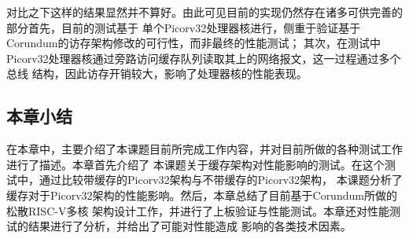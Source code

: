 对比之下这样的结果显然并不算好。由此可见目前的实现仍然存在诸多可供完善的部分首先，目前的测试基于
单个Picorv32处理器核进行，侧重于验证基于Corundum的访存架构修改的可行性，而非最终的性能测试；
其次，在测试中Picorv32处理器核通过旁路访问缓存队列读取其上的网络报文，这一过程通过多个总线
结构，因此访存开销较大，影响了处理器核的性能表现。

\subsection{本章小结}

在本章中，主要介绍了本课题目前所完成工作内容，并对目前所做的各种测试工作进行了描述。本章首先介绍了
本课题关于缓存架构对性能影响的测试。在这个测试中，通过比较带缓存的Picorv32架构与不带缓存的Picorv32架构，
本课题分析了缓存对于Picorv32架构的性能影响。然后，本章总结了目前基于Corundum所做的松散RISC-V多核
架构设计工作，并进行了上板验证与性能测试。本章还对性能测试的结果进行了分析，并给出了可能对性能造成
影响的各类技术因素。
